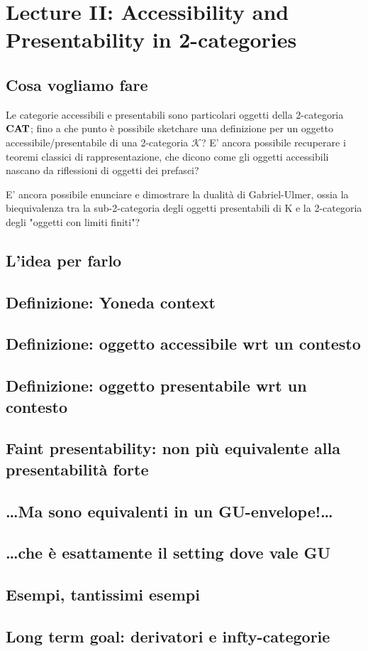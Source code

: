 \documentclass[11pt]{article}
\begin{document}
\section{Lecture II: Accessibility and Presentability in 2-categories}
\label{sec:orge67549c}
\subsection{Cosa vogliamo fare}
\label{sec:orgf93fd49}
Le categorie accessibili e presentabili sono particolari
oggetti della 2-categoria \(\bf CAT\); fino a che punto è possibile
sketchare una definizione per un oggetto
accessibile/presentabile di una 2-categoria \(\mathcal K\)? E' ancora
possibile recuperare i teoremi classici di rappresentazione,
che dicono come gli oggetti accessibili nascano da
riflessioni di oggetti dei prefasci?

E' ancora possibile enunciare e dimostrare la dualità di
Gabriel-Ulmer, ossia la biequivalenza tra la sub-2-categoria
degli oggetti presentabili di K e la 2-categoria degli
"oggetti con limiti finiti"?

\subsection{L'idea per farlo}
\label{sec:org16d78da}
\subsection{Definizione: Yoneda context}
\label{sec:org5b6050a}
\subsection{Definizione: oggetto accessibile wrt un contesto}
\label{sec:org8056442}
\subsection{Definizione: oggetto presentabile wrt un contesto}
\label{sec:orge560ac8}
\subsection{Faint presentability: non più equivalente alla presentabilità forte}
\label{sec:orgcfe39da}
\subsection{\ldots{}Ma sono equivalenti in un GU-envelope!\ldots{}}
\label{sec:orgeab109d}
\subsection{\ldots{}che è esattamente il setting dove vale GU}
\label{sec:org67232a0}
\subsection{Esempi, tantissimi esempi}
\label{sec:org919ea69}
\subsection{Long term goal: derivatori e infty-categorie}
\label{sec:orgda58b7e}
\end{document}
